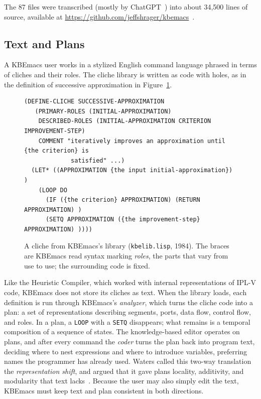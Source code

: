 \documentclass[11pt]{article}
\begin{document}
The 87 files were transcribed (mostly by ChatGPT~\cite{chatgpt}) into
about 34,500 lines of source, available at
\url{https://github.com/jeffshrager/kbemacs}~\cite{kbemacsrepo}.

\subsection{Text and Plans}

A KBEmacs user works in a stylized English command language phrased in
terms of cliches and their roles. The cliche library is written as
code with holes, as in the definition of successive approximation
in Figure~\ref{fig:cliche}.

\begin{figure}[H]
\begin{lstlisting}
(DEFINE-CLICHE SUCCESSIVE-APPROXIMATION
   (PRIMARY-ROLES (INITIAL-APPROXIMATION)
    DESCRIBED-ROLES (INITIAL-APPROXIMATION CRITERION IMPROVEMENT-STEP)
    COMMENT "iteratively improves an approximation until {the criterion} is
             satisfied" ...)
  (LET* ((APPROXIMATION {the input initial-approximation}) )
    (LOOP DO
      (IF ({the criterion} APPROXIMATION) (RETURN APPROXIMATION) )
      (SETQ APPROXIMATION ({the improvement-step} APPROXIMATION) ))))
\end{lstlisting}
\caption{A cliche from KBEmacs's library (\texttt{kbelib.lisp}, 1984).
The braces are KBEmacs read syntax marking \emph{roles}, the parts that
vary from use to use; the surrounding code is fixed.}
\label{fig:cliche}
\end{figure}
Like the Heuristic Compiler, which worked with internal
representations of IPL-V code, KBEmacs does not store its cliches as
text. When the library loads, each definition is run through
KBEmacs's \emph{analyzer}, which turns the cliche code into a plan: a
set of representations describing segments, ports, data flow, control
flow, and roles. In a plan, a \texttt{LOOP} with a \texttt{SETQ}
disappears; what remains is a temporal composition of a sequence of
states. The knowledge-based editor operates on plans, and after every
command the \emph{coder} turns the plan back into program text,
deciding where to nest expressions and where to introduce variables,
preferring names the programmer has already used. Waters called this
two-way translation the \emph{representation shift}, and argued that
it gave plans locality, additivity, and modularity that text
lacks~\cite{waters1986aimag}. Because the user may also simply edit
the text, KBEmacs must keep text and plan consistent in both
directions.
\end{document}
